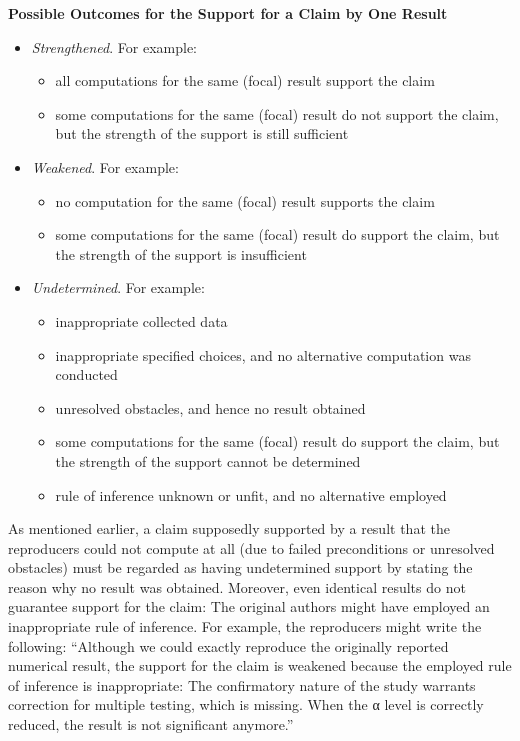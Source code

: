 \documentclass[authordate, meta]{jote-new-article}
\begin{document}
	\begin{rightWide}[Box 4]
	\textbf{Possible Outcomes for the Support for a Claim by One Result}
	
	\begin{itemize}
		\item \emph{Strengthened}.  For example:
		\begin{itemize}[leftmargin=2.5em, label={\hspace{1em}\textendash}]
			\item all computations for the same (focal) result support the claim
			\item some computations for the same (focal) result do not support the claim, but the strength of the support is still sufficient
		\end{itemize}
		\item \emph{Weakened}. For example:
		\begin{itemize}[leftmargin=2.5em, label={\hspace{1em}\textendash}]
			\item no computation for the same (focal) result supports the claim
			\item some computations for the same (focal) result do support the claim, but the strength of the support is insufficient
		\end{itemize}
		\item \emph{Undetermined}. For example:
		 \begin{itemize}[leftmargin=2.5em, label={\hspace{1em}\textendash}]
			\item inappropriate collected data
			\item inappropriate specified choices, and no alternative computation was conducted
			\item  unresolved obstacles, and hence no result obtained
			\item some computations for the same (focal) result do support the claim, but the strength of the support cannot be determined
			\item rule of inference unknown or unfit, and no alternative employed
		\end{itemize}
	\end{itemize}
	\end{rightWide}

	As mentioned earlier, a claim supposedly supported by a result that the reproducers could not compute at all (due to failed preconditions or unresolved obstacles) must be regarded as having undetermined support by stating the reason why no result was obtained. Moreover, even identical results do not guarantee support for the claim: The original authors might have employed an inappropriate rule of inference. For example, the reproducers might write the following: “Although we could exactly reproduce the originally reported numerical result, the support for the claim is weakened because the employed rule of inference is inappropriate: The confirmatory nature of the study warrants correction for multiple testing, which is missing. When the α level is correctly reduced, the result is not significant anymore.”
\end{document}
